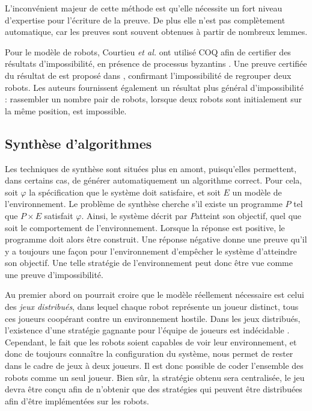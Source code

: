 L'inconvénient majeur de cette méthode est qu'elle nécessite un fort
niveau d'expertise pour l'écriture de la preuve. De plus elle n'est
pas complètement automatique, car les preuves sont souvent obtenues à
partir de nombreux lemmes.

Pour le modèle de robots, Courtieu \emph{et al.} ont utilisé COQ afin
de certifier des résultats d'impossibilité, en présence
de processus byzantins \cite{AugerBCTU13}. Une preuve certifiée du
résultat de \cite{suzuki_distributed_1999} est proposé
dans \cite{CourtieuRTU15}, confirmant l'impossibilité de regrouper deux
robots. Les auteurs fournissent également un résultat plus général
d'impossibilité : rassembler un nombre pair de robots, lorsque deux
robots sont initialement sur la même position, est impossible.
		
\subsection{Synthèse d'algorithmes}
Les techniques de synthèse sont situées plus en amont, puisqu'elles
permettent, dans certains cas, de générer automatiquement un
algorithme correct.  Pour cela, soit $\varphi$ la spécification que le
système doit satisfaire, et soit $E$ un modèle de l'environnement.  Le
problème de synthèse cherche s'il existe un programme $P$ tel que $P
\times E$ satisfait $\varphi$. Ainsi, le système décrit par $P$atteint
son objectif, quel que soit le comportement de l'environnement.
Lorsque la réponse est positive, le programme doit alors être
construit.  Une réponse négative donne une preuve qu'il y a toujours
une façon pour l'environnement d'empêcher le système d'atteindre son
objectif. Une telle stratégie de l'environnement peut donc être vue
comme une preuve d'impossibilité.


Au premier abord on pourrait croire que le modèle réellement
nécessaire est celui des \emph{jeux distribués}, dans lequel chaque
robot représente un joueur distinct, tous ces joueurs coopérant contre
un environnement hostile. Dans les jeux distribués, l'existence d'une
stratégie gagnante pour l'équipe de joueurs est indécidable
\cite{PetersonReif79}. Cependant, le fait que les robots soient
capables de voir leur environnement, et donc de toujours connaître la
configuration du système, nous permet de rester dans le cadre de jeux
à deux joueurs. Il est donc possible de coder l'ensemble des robots comme
un seul joueur.  Bien sûr, la stratégie obtenu sera centralisée, le
jeu devra être conçu afin de n'obtenir que des stratégies qui peuvent
être distribuées afin d'être implémentées sur les robots.

